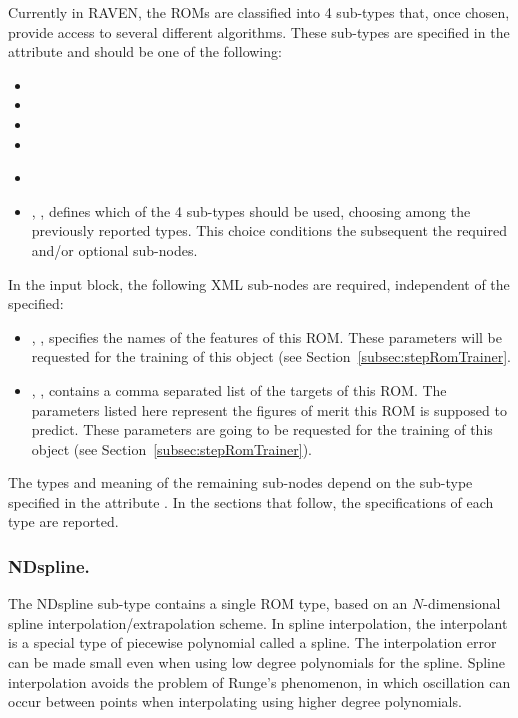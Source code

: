 Currently in RAVEN, the ROMs are classified into 4 sub-types that, once chosen,
provide access to several different algorithms.
%
These sub-types are specified in the  attribute and should be
one of the following:
\begin{itemize}
  \item {}
  \item {}
  \item {}
  \item {}
\end{itemize}

%
\attrsIntro
%
\vspace{-5mm}
\begin{itemize}
  \itemsep0em
  \item \nameDescription
  \item {}, , defines which of
  the 4 sub-types should be used, choosing among the previously reported
  types.
  This choice conditions the subsequent the required and/or optional 
   sub-nodes.
\end{itemize}
\vspace{-5mm}

In the  input block, the following XML sub-nodes are required,
independent of the  specified:
%
\begin{itemize}
  \item {}, ,
  specifies the names of the features of this ROM.
  \nb These parameters will be requested for the training of this object (see
  Section~\ref{subsec:stepRomTrainer}.
  \item {}, ,
  contains a comma separated list of the targets of this ROM.
  The parameters listed here represent the figures of merit this ROM is supposed
  to predict.
  \nb These parameters are going to be requested for the training of this object
  (see Section~\ref{subsec:stepRomTrainer}).
\end{itemize}

The types and meaning of the remaining sub-nodes depend on the sub-type
specified in the attribute .
%
In the sections that follow, the specifications of each type are reported.
%
\subsubsection{NDspline.}
\label{subsubsec:NDspline}
The NDspline sub-type contains a single ROM type, based on an $N$-dimensional
spline interpolation/extrapolation scheme.
%
In spline interpolation, the interpolant is a special type of piecewise
polynomial called a spline.
%
The interpolation error can be made small even when using low degree polynomials
for the spline.
%
Spline interpolation avoids the problem of Runge's phenomenon, in which
oscillation can occur between points when interpolating using higher degree
polynomials.
%

